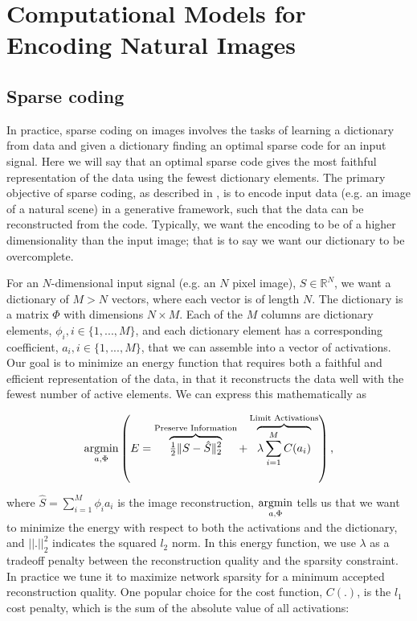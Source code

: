 \chapter{Computational Models for Encoding Natural Images}

\section{Sparse coding}
In practice, sparse coding on images involves the tasks of learning a dictionary from data and given a dictionary finding an optimal sparse code for an input signal. Here we will say that an optimal sparse code gives the most faithful representation of the data using the fewest dictionary elements. The primary objective of sparse coding, as described in \cite{olshausen1997sparse}, is to encode input data (e.g. an image of a natural scene) in a generative framework, such that the data can be reconstructed from the code. Typically, we want the encoding to be of a higher dimensionality than the input image; that is to say we want our dictionary to be overcomplete.

For an $N$-dimensional input signal (e.g. an $N$ pixel image), $S \in \mathbb{R}^{N}$, we want a dictionary of $M > N$ vectors, where each vector is of length $N$. The dictionary is a matrix $\Phi$ with dimensions $N \times M$. Each of the $M$ columns are dictionary elements, $\phi_{i}, i \in \{1,...,M\}$, and each dictionary element has a corresponding coefficient, $a_{i}, i \in \{1,...,M\}$, that we can assemble into a vector of activations. Our goal is to minimize an energy function that requires both a faithful and efficient representation of the data, in that it reconstructs the data well with the fewest number of active elements. We can express this mathematically as

\begin{equation}
    \argmin\limits_{a, \Phi}
        \left( E =
            \overbrace{ \tfrac{1}{2} \| S - \hat{S} \|_{2}^{2} }^\text{Preserve Information} +
        \overbrace{ \lambda \sum\limits_{i=1}^{M}C(a_{i}) }^\text{Limit Activations} \right),
\label{energyfunc}
\end{equation}

where $\hat{S} = \sum\limits_{i=1}^{M}\phi_{i}a_{i}$ is the image reconstruction, $\argmin\limits_{a, \Phi}$ tells us that we want to minimize the energy with respect to both the activations and the dictionary, and $||.||_2^2$ indicates the squared $l_2$ norm. In this energy function, we use $\lambda$ as a tradeoff penalty between the reconstruction quality and the sparsity constraint. In practice we tune it to maximize network sparsity for a minimum accepted reconstruction quality. One popular choice for the cost function, $C(.)$, is the $l_1$ cost penalty, which is the sum of the absolute value of all activations:

